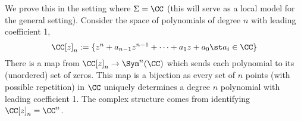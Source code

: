 

    We prove this in the setting where $\Sigma=\CC$ (this will serve as a local model for the general setting). 
    Consider the space of polynomials of degree $n$ with leading coefficient 1, 
    \[\CC[z]_n:=\{z^n+a_{n-1}z^{n-1}+\cdots + a_1z+a_0\st a_i\in \CC\}\]
    There is a map from $\CC[z]_n\to \Sym^n(\CC)$ which sends each polynomial to its (unordered) set of zeros. This map is a bijection as every set of $n$ points (with possible repetition) in $\CC$ uniquely determines a degree $n$ polynomial with leading coefficient 1.
    The complex structure comes from identifying $\CC[z]_n = \CC^n$.
